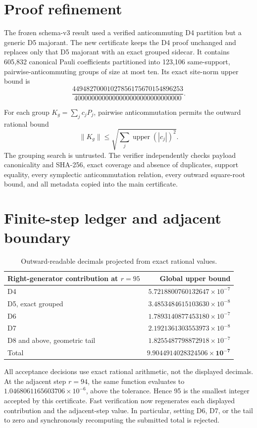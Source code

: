 \documentclass[10pt]{article}
\begin{document}
\section{Proof refinement}

The frozen schema-v3 result used a verified anticommuting D4 partition but a
generic D5 majorant.  The new certificate keeps the D4 proof unchanged and
replaces only that D5 majorant with an exact grouped sidecar.  It contains
605,832 canonical Pauli coefficients partitioned into 123,106 same-support,
pairwise-anticommuting groups of size at most ten.  Its exact site-norm upper
bound is
\[
 \frac{44948270001027856175670154896253}
 {4000000000000000000000000000000}.
\]

For each group $K_g=\sum_j c_jP_j$, pairwise anticommutation permits the
outward rational bound
\[
 \lVert K_g\rVert\le
 \sqrt{\sum_j \operatorname{upper}(|c_j|)^2}.
\]
The grouping search is untrusted.  The verifier independently checks payload
canonicality and SHA-256, exact coverage and absence of duplicates, support
equality, every symplectic anticommutation relation, every outward square-root
bound, and all metadata copied into the main certificate.

\section{Finite-step ledger and adjacent boundary}

\begin{table}[h]
\centering
\begin{tabular}{@{}lr@{}}
\toprule
Right-generator contribution at $r=95$ & Global upper bound \\
\midrule
D4 & $5.7218800760132647\times10^{-7}$ \\
D5, exact grouped & $3.4853484615103630\times10^{-8}$ \\
D6 & $1.7893140877453180\times10^{-7}$ \\
D7 & $2.1921361303553973\times10^{-8}$ \\
D8 and above, geometric tail & $1.8255487798872918\times10^{-7}$ \\
\midrule
Total & $\mathbf{9.9044914028324506\times10^{-7}}$ \\
\bottomrule
\end{tabular}
\caption{Outward-readable decimals projected from exact rational values.}
\end{table}

All acceptance decisions use exact rational arithmetic, not the displayed
decimals.  At the adjacent step $r=94$, the same function evaluates to
$1.0468061165603706\times10^{-6}$, above the tolerance.  Hence 95 is the
smallest integer accepted by this certificate.  Fast verification now
regenerates each displayed contribution and the adjacent-step value.  In
particular, setting D6, D7, or the tail to zero and synchronously recomputing
the submitted total is rejected.
\end{document}
